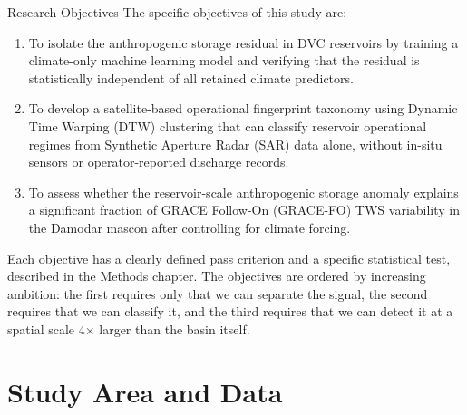 \documentclass[10pt]{beamer}
\begin{document}
\begin{frame}{Research Objectives}
  \small
  The specific objectives of this study are:

  \smallskip
  \begin{enumerate}[label=(\alph*)]\footnotesize
    \item To isolate the anthropogenic storage residual in DVC reservoirs by
      training a climate-only machine learning model and verifying that the
      residual is statistically independent of all retained climate predictors.
    \item To develop a satellite-based operational fingerprint taxonomy using
      Dynamic Time Warping (DTW) clustering that can classify reservoir
      operational regimes from Synthetic Aperture Radar (SAR) data alone,
      without in-situ sensors or operator-reported discharge records.
    \item To assess whether the reservoir-scale anthropogenic storage anomaly
      explains a significant fraction of GRACE Follow-On (GRACE-FO) TWS
      variability in the Damodar mascon after controlling for climate forcing.
  \end{enumerate}

  \smallskip
  \small
  Each objective has a clearly defined pass criterion and a specific
  statistical test, described in the Methods chapter. The objectives are
  ordered by increasing ambition: the first requires only that we can
  separate the signal, the second requires that we can classify it, and the
  third requires that we can detect it at a spatial scale 4$\times$ larger
  than the basin itself.
\end{frame}


\section{Study Area and Data}
\end{document}
